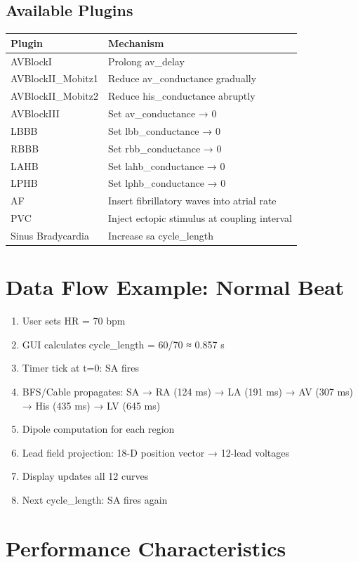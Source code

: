 \documentclass[11pt, a4paper]{article}
\begin{document}
\subsection{Available Plugins}

\begin{tabularx}{\textwidth}{|l|X|}
\hline
\textbf{Plugin} & \textbf{Mechanism} \\
\hline
AVBlockI & Prolong av\_delay \\
AVBlockII\_Mobitz1 & Reduce av\_conductance gradually \\
AVBlockII\_Mobitz2 & Reduce his\_conductance abruptly \\
AVBlockIII & Set av\_conductance → 0 \\
LBBB & Set lbb\_conductance → 0 \\
RBBB & Set rbb\_conductance → 0 \\
LAHB & Set lahb\_conductance → 0 \\
LPHB & Set lphb\_conductance → 0 \\
AF & Insert fibrillatory waves into atrial rate \\
PVC & Inject ectopic stimulus at coupling interval \\
Sinus Bradycardia & Increase sa cycle\_length \\
\hline
\end{tabularx}

\section{Data Flow Example: Normal Beat}

\begin{enumerate}
    \item User sets HR = 70 bpm
    \item GUI calculates cycle\_length = 60/70 ≈ 0.857 s
    \item Timer tick at t=0: SA fires
    \item BFS/Cable propagates: SA → RA (124 ms) → LA (191 ms) → AV (307 ms) → His (435 ms) → LV (645 ms)
    \item Dipole computation for each region
    \item Lead field projection: 18-D position vector → 12-lead voltages
    \item Display updates all 12 curves
    \item Next cycle_length: SA fires again
\end{enumerate}

\section{Performance Characteristics}
\end{document}
